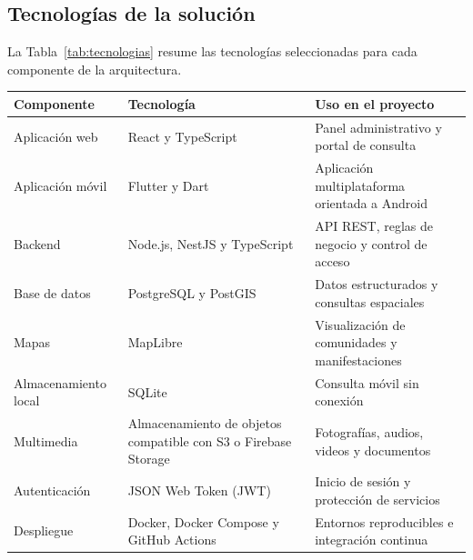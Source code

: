 \subsection{Tecnologías de la solución}
La Tabla~\ref{tab:tecnologias} resume las tecnologías seleccionadas para cada componente de la arquitectura.

{\centering\singlespacing
  \label{tab:tecnologias}
  \begin{tabular}{|p{}|p{}|p{}|}
    \hline
    \textbf{Componente} & \textbf{Tecnología} & \textbf{Uso en el proyecto} \tabularnewline
    \hline
    \raggedright Aplicación web & \raggedright React y TypeScript \cite{react2026docs} & \raggedright Panel administrativo y portal de consulta \tabularnewline
    \hline
    \raggedright Aplicación móvil & \raggedright Flutter y Dart \cite{flutter2026docs} & \raggedright Aplicación multiplataforma orientada a Android \tabularnewline
    \hline
    \raggedright Backend & \raggedright Node.js, NestJS y TypeScript \cite{nestjs2026docs} & \raggedright API REST, reglas de negocio y control de acceso \tabularnewline
    \hline
    \raggedright Base de datos & \raggedright PostgreSQL y PostGIS \cite{postgis2026docs} & \raggedright Datos estructurados y consultas espaciales \tabularnewline
    \hline
    \raggedright Mapas & \raggedright MapLibre \cite{maplibre2026docs} & \raggedright Visualización de comunidades y manifestaciones \tabularnewline
    \hline
    \raggedright Almacenamiento local & \raggedright SQLite & \raggedright Consulta móvil sin conexión \tabularnewline
    \hline
    \raggedright Multimedia & \raggedright Almacenamiento de objetos compatible con S3 o Firebase Storage & \raggedright Fotografías, audios, videos y documentos \tabularnewline
    \hline
    \raggedright Autenticación & \raggedright JSON Web Token (JWT) & \raggedright Inicio de sesión y protección de servicios \tabularnewline
    \hline
    \raggedright Despliegue & \raggedright Docker, Docker Compose y GitHub Actions & \raggedright Entornos reproducibles e integración continua \tabularnewline
    \hline
  \end{tabular}\par}


